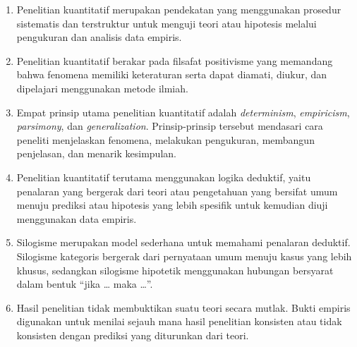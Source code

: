 \documentclass[
  indonesian,
  letterpaper,
  DIV=11,
  numbers=noendperiod]{scrreprt}
\providecommand{\tightlist}{%
  \setlength{\itemsep}{0pt}\setlength{\parskip}{0pt}}
\begin{document}
\begin{tcolorbox}[enhanced jigsaw, colframe=quarto-callout-tip-color-frame, toptitle=1mm, breakable, leftrule=.75mm, arc=.35mm, toprule=.15mm, colback=white, colbacktitle=quarto-callout-tip-color!10!white, bottomtitle=1mm, bottomrule=.15mm, titlerule=0mm, title=\textcolor{quarto-callout-tip-color}{\faLightbulb}\hspace{0.5em}{Rangkuman}, coltitle=black, left=2mm, opacitybacktitle=0.6, opacityback=0, rightrule=.15mm]

\begin{enumerate}
\def\labelenumi{\arabic{enumi}.}
\tightlist
\item
  Penelitian kuantitatif merupakan pendekatan yang menggunakan prosedur
  sistematis dan terstruktur untuk menguji teori atau hipotesis melalui
  pengukuran dan analisis data empiris.
\item
  Penelitian kuantitatif berakar pada filsafat positivisme yang
  memandang bahwa fenomena memiliki keteraturan serta dapat diamati,
  diukur, dan dipelajari menggunakan metode ilmiah.
\item
  Empat prinsip utama penelitian kuantitatif adalah \emph{determinism},
  \emph{empiricism}, \emph{parsimony}, dan \emph{generalization}.
  Prinsip-prinsip tersebut mendasari cara peneliti menjelaskan fenomena,
  melakukan pengukuran, membangun penjelasan, dan menarik kesimpulan.
\item
  Penelitian kuantitatif terutama menggunakan logika deduktif, yaitu
  penalaran yang bergerak dari teori atau pengetahuan yang bersifat umum
  menuju prediksi atau hipotesis yang lebih spesifik untuk kemudian
  diuji menggunakan data empiris.
\item
  Silogisme merupakan model sederhana untuk memahami penalaran deduktif.
  Silogisme kategoris bergerak dari pernyataan umum menuju kasus yang
  lebih khusus, sedangkan silogisme hipotetik menggunakan hubungan
  bersyarat dalam bentuk ``jika \ldots{} maka \ldots{}''.
\item
  Hasil penelitian tidak membuktikan suatu teori secara mutlak. Bukti
  empiris digunakan untuk menilai sejauh mana hasil penelitian konsisten
  atau tidak konsisten dengan prediksi yang diturunkan dari teori.
\end{enumerate}

\end{tcolorbox}
\end{document}
